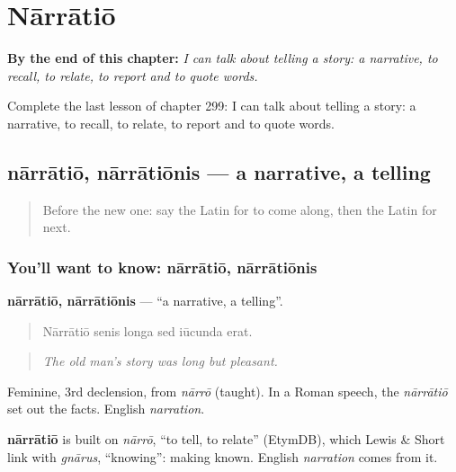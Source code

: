 
\chapter{Nārrātiō}
\label{ch:la-narratio}

\begin{chapteropening}
\textbf{By the end of this chapter:} \emph{I can talk about telling a story: a narrative, to recall, to relate, to report and to quote words.}

Complete the last lesson of chapter 299: I can talk about telling a story: a narrative, to recall, to relate, to report and to quote words.
\end{chapteropening}

\section[nārrātiō, nārrātiōnis]{nārrātiō, nārrātiōnis — a narrative, a telling}

\label{lesson:LA-C299-narratio}



\begin{quote}
Before the new one: say the Latin for to come along, then the Latin for next.
\end{quote}

\subsection*{You'll want to know: nārrātiō, nārrātiōnis}
\textbf{nārrātiō, nārrātiōnis} — \textquotedblleft{}a narrative, a telling\textquotedblright{}.

\begin{quote}
Nārrātiō senis longa sed iūcunda erat.
\end{quote}

\begin{quote}
\emph{The old man's story was long but pleasant.}
\end{quote}

Feminine, 3rd declension, from \emph{nārrō} (taught). In a Roman speech, the \emph{nārrātiō} set out the facts. English \emph{narration}.

\begin{cousinweb}
\textbf{nārrātiō} is built on \emph{nārrō}, \textquotedblleft{}to tell, to relate\textquotedblright{} (EtymDB), which Lewis \& Short link with \emph{gnārus}, \textquotedblleft{}knowing\textquotedblright{}: making known. English \emph{narration} comes from it.
\end{cousinweb}

